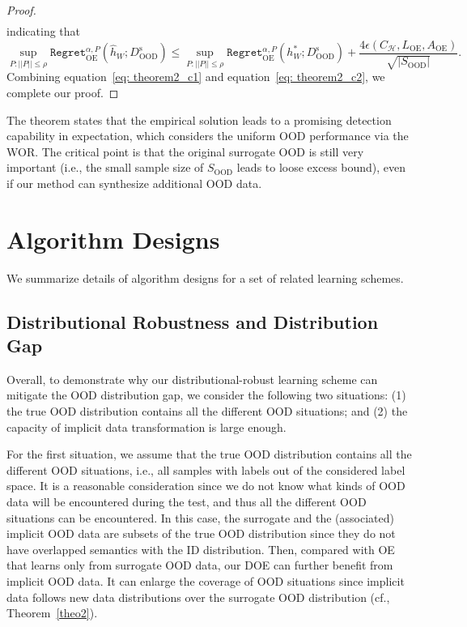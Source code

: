 \documentclass{article} \usepackage{iclr2022_conference,times}
\def\eqref#1{equation~\ref{#1}}
\begin{document}
\begin{proof}
\begin{align}
\end{align}
indicating that 
\begin{equation}
     \sup_{P: \lvert\lvert  P\rvert\rvert \le \rho}  {\texttt{Regret}}_{\text{OE}}^{\alpha, P}(\hat{h}_{W}; D^\text{s}_\text{OOD}) \le  \sup_{P: \lvert\lvert  P\rvert\rvert \le \rho}  {\texttt{Regret}}_{\text{OE}}^{\alpha, P}({h}^*_{W}; D^\text{s}_\text{OOD}) +  \frac{4 \epsilon(C_\mathcal{H}, L_\text{OE}, A_\text{OE})}{\sqrt{\lvert S_\text{OOD} \rvert}}. \label{eq: theorem2_c2} 
\end{equation}
Combining \eqref{eq: theorem2_c1} and \eqref{eq: theorem2_c2}, we complete our proof. 
\end{proof}

The theorem states that the empirical solution leads to a promising detection capability in expectation, which considers the uniform OOD performance via the WOR. The critical point is that the original surrogate OOD is still very important (i.e., the small sample size of $S_\text{OOD}$ leads to loose excess bound), even if our method can synthesize additional OOD data. 

\clearpage
\section{Algorithm Designs}
\label{app: alg}

We summarize details of algorithm designs for a set of related learning schemes. 

\subsection{Distributional Robustness and Distribution Gap}


{
Overall, to demonstrate why our distributional-robust learning scheme can mitigate the OOD distribution gap, we consider the following two situations: (1) the true OOD distribution contains all the different OOD situations; and (2) the capacity of implicit data transformation is large enough.
}

{
For the first situation, we assume that the true OOD distribution contains all the different OOD situations, i.e., all samples with labels out of the considered label space. It is a reasonable consideration since we do not know what kinds of OOD data will be encountered during the test, and thus all the different OOD situations can be encountered. In this case, the surrogate and the (associated) implicit OOD data are subsets of the true OOD distribution since they do not have overlapped semantics with the ID distribution. Then, compared with OE that learns only from surrogate OOD data, our DOE can further benefit from implicit OOD data. It can enlarge the coverage of OOD situations since implicit data follows new data distributions over the surrogate OOD distribution (cf., Theorem~\ref{theo2}).}
\end{document}

